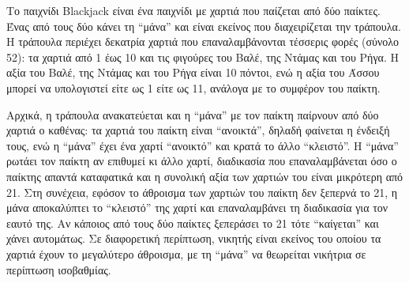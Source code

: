\documentclass[a4paper,11pt,oneside]{book}
\begin{document}
\begin{exercise}

Το παιχνίδι Blackjack είναι ένα παιχνίδι με χαρτιά που παίζεται από δύο παίκτες. Ένας από τους δύο κάνει τη ``μάνα'' και είναι εκείνος που διαχειρίζεται την τράπουλα. 
Η τράπουλα περιέχει δεκατρία χαρτιά που επαναλαμβάνονται τέσσερις φορές (σύνολο 52): τα χαρτιά από 1 έως 10 και τις φιγούρες του Βαλέ, της Ντάμας και του Ρήγα. Η αξία του Βαλέ, της Ντάμας και του Ρήγα είναι 10 πόντοι, ενώ η αξία του Άσσου μπορεί να υπολογιστεί είτε ως 1 είτε ως 11, ανάλογα με το συμφέρον του παίκτη. 

Αρχικά, %
η τράπουλα ανακατεύεται και η ``μάνα'' με τον παίκτη παίρνουν από δύο χαρτιά ο καθένας: τα χαρτιά του παίκτη είναι ``ανοικτά'', δηλαδή φαίνεται η ένδειξή τους, ενώ η ``μάνα'' έχει ένα χαρτί ``ανοικτό'' και κρατά το άλλο ``κλειστό''. 
Η ``μάνα'' ρωτάει τον παίκτη αν επιθυμεί κι άλλο χαρτί, διαδικασία που επαναλαμβάνεται όσο ο παίκτης απαντά καταφατικά και η συνολική αξία των χαρτιών του είναι μικρότερη από 21. Στη συνέχεια, εφόσον το άθροισμα των χαρτιών του παίκτη δεν ξεπερνά το 21, η μάνα αποκαλύπτει το ``κλειστό'' της χαρτί και επαναλαμβάνει τη διαδικασία για τον εαυτό της. 
Αν κάποιος από τους δύο παίκτες ξεπεράσει το 21 τότε ``καίγεται'' και χάνει αυτομάτως. Σε διαφορετική περίπτωση, νικητής είναι εκείνος του οποίου τα χαρτιά έχουν το μεγαλύτερο άθροισμα, με τη ``μάνα'' να θεωρείται νικήτρια σε περίπτωση ισοβαθμίας.


\end{exercise}
\end{document}
